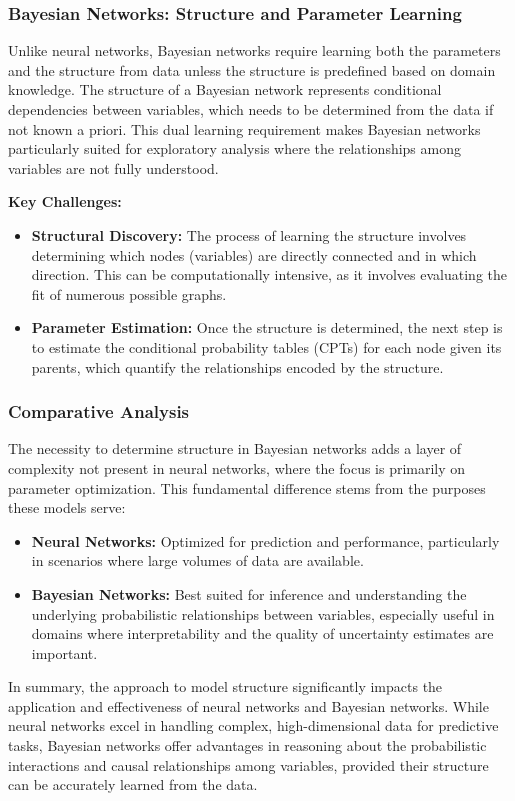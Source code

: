 \subsubsection{Bayesian Networks: Structure and Parameter Learning}
Unlike neural networks, Bayesian networks require learning both the parameters and the structure from data unless the structure is predefined based on domain knowledge. The structure of a Bayesian network represents conditional dependencies between variables, which needs to be determined from the data if not known a priori. This dual learning requirement makes Bayesian networks particularly suited for exploratory analysis where the relationships among variables are not fully understood.

\textbf{Key Challenges:}
\begin{itemize}
    \item \textbf{Structural Discovery:} The process of learning the structure involves determining which nodes (variables) are directly connected and in which direction. This can be computationally intensive, as it involves evaluating the fit of numerous possible graphs.
    \item \textbf{Parameter Estimation:} Once the structure is determined, the next step is to estimate the conditional probability tables (CPTs) for each node given its parents, which quantify the relationships encoded by the structure.
\end{itemize}

\subsubsection{Comparative Analysis}
The necessity to determine structure in Bayesian networks adds a layer of complexity not present in neural networks, where the focus is primarily on parameter optimization. This fundamental difference stems from the purposes these models serve:
\begin{itemize}
    \item \textbf{Neural Networks:} Optimized for prediction and performance, particularly in scenarios where large volumes of data are available.
    \item \textbf{Bayesian Networks:} Best suited for inference and understanding the underlying probabilistic relationships between variables, especially useful in domains where interpretability and the quality of uncertainty estimates are important.
\end{itemize}

In summary, the approach to model structure significantly impacts the application and effectiveness of neural networks and Bayesian networks. While neural networks excel in handling complex, high-dimensional data for predictive tasks, Bayesian networks offer advantages in reasoning about the probabilistic interactions and causal relationships among variables, provided their structure can be accurately learned from the data.

